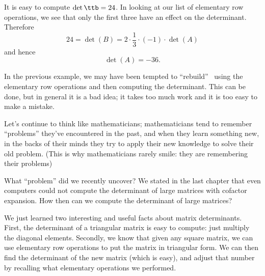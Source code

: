 \pagebreak

{
It is easy to compute $\det\ttb=24$. In looking at our list of elementary row operations, we see that only the first three have an effect on the determinant. Therefore 
\[
24 = \det(B) = 2\cdot \frac13  \cdot (-1)\cdot \det(A)
\]
and hence 
\[
\det(A) = -36.
\]
} 

\medskip

In the previous example, we may have been tempted to ``rebuild'' \tta\ using the elementary row operations and then computing the determinant. This can be done, but in general it is a bad idea; it takes too much work and it is too easy to make a mistake. 


Let's continue to think like mathematicians; mathematicians tend to remember ``problems'' they've encountered in the past, and when they learn something new, in the backs of their minds they try to apply their new knowledge to solve their old problem. (This is why mathematicians rarely smile: they are remembering their problems)

What ``problem'' did we recently uncover? We stated in the last chapter that even computers could not compute the determinant of large matrices with cofactor expansion. How then can we compute the determinant of large matrices?

We just learned two interesting and useful facts about matrix determinants. First, the determinant of a triangular matrix is easy to compute: just multiply the diagonal elements. Secondly, we know that given any square matrix, we can use elementary row operations to put the matrix in triangular form.  We can then find the determinant of the new matrix (which is easy), and adjust that number by recalling what elementary operations we performed. 

